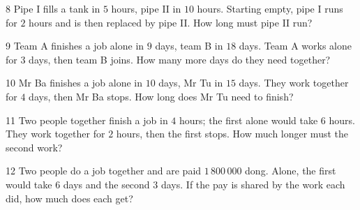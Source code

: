 \gap
\begin{probbox}{8}{\relax}
Pipe I fills a tank in $5$ hours, pipe II in $10$ hours. Starting empty, pipe I runs for $2$ hours and is then replaced by pipe II. How long must pipe II run?
\end{probbox}
\gap
\begin{probbox}{9}{\relax}
Team A finishes a job alone in $9$ days, team B in $18$ days. Team A works alone for $3$ days, then team B joins. How many more days do they need together?
\end{probbox}
\gap
\begin{probbox}{10}{\relax}
Mr Ba finishes a job alone in $10$ days, Mr Tu in $15$ days. They work together for $4$ days, then Mr Ba stops. How long does Mr Tu need to finish?
\end{probbox}
\gap
\begin{probbox}{11}{\relax}
Two people together finish a job in $4$ hours; the first alone would take $6$ hours. They work together for $2$ hours, then the first stops. How much longer must the second work?
\end{probbox}
\gap
\begin{probbox}{12}{\relax}
Two people do a job together and are paid $1\,800\,000$ dong. Alone, the first would take $6$ days and the second $3$ days. If the pay is shared by the work each did, how much does each get?
\end{probbox}
